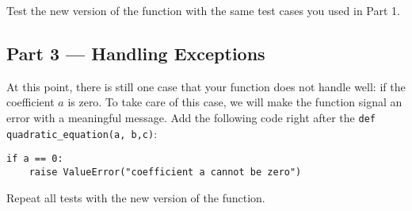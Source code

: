 \documentclass[12pt]{article}
\begin{document}
Test the new version of the function with the same test cases you used in Part 1.

\subsection{Part 3 --- Handling Exceptions}

At this point, there is still one case that your function does not handle well: if the coefficient $a$ is zero. To take care of this case, we will make the function signal an error with a meaningful message. Add the following code right after the \lstinline{def quadratic_equation(a, b,c)}:

\begin{lstlisting}
if a == 0:
    raise ValueError("coefficient a cannot be zero")
\end{lstlisting}

Repeat all tests with the new version of the function.
\end{document}
